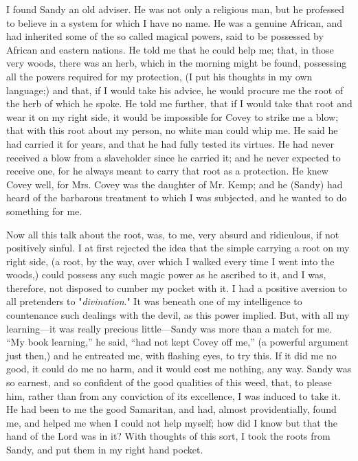 I found Sandy an old adviser. He was not only a religious man, but he
professed to believe in a system for which I have no name. He was a
genuine African, and had inherited some of the so called magical powers,
said to be possessed by African and eastern nations. He told me that he
could help me; that, in those very woods, there was an herb, which in
the morning might be found, possessing all the powers required for my
protection, (I put his thoughts in my own language;) and that, if I
would take his advice, he would procure me the root of the herb of which
he spoke. He told me further, that if I would take that root and wear it
on my right side, it would be impossible for Covey to strike me a blow;
that with this root about my person, no white man could whip me. He said
he had carried it for years, and that he had fully tested its virtues.
He had never received a blow from a slaveholder since he carried it; and
he never expected to receive one, for he always meant to carry that root
as a protection. He knew Covey well, for Mrs. Covey was the daughter of
Mr. Kemp; and he (Sandy) had heard of the barbarous treatment {}to which
I was subjected, and he wanted to do something for me.

Now all this talk about the root, was, to me, very absurd and
ridiculous, if not positively sinful. I at first rejected the idea that
the simple carrying a root on my right side, (a root, by the way, over
which I walked every time I went into the woods,) could possess any such
magic power as he ascribed to it, and I was, therefore, not disposed to
cumber my pocket with it. I had a positive aversion to all pretenders to
"\emph{divination}." It was beneath one of my intelligence to
countenance such dealings with the devil, as this power implied. But,
with all my learning---it was really precious little---Sandy was more
than a match for me. ``My book learning,'' he said, ``had not kept Covey
off me,'' (a powerful argument just then,) and he entreated me, with
flashing eyes, to try this. If it did me no good, it could do me no
harm, and it would cost me nothing, any way. Sandy was so earnest, and
so confident of the good qualities of this weed, that, to please him,
rather than from any conviction of its excellence, I was induced to take
it. He had been to me the good Samaritan, and had, almost
providentially, found me, and helped me when I could not help myself;
how did I know but that the hand of the Lord was in it? With thoughts of
this sort, I took the roots from Sandy, and put them in my right hand
pocket.

